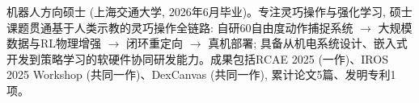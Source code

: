 
\begin{cvparagraph}
机器人方向硕士 (上海交通大学, 2026年6月毕业)。专注灵巧操作与强化学习, 硕士课题贯通基于人类示教的灵巧操作全链路: 自研60自由度动作捕捉系统 $\rightarrow$ 大规模数据与RL物理增强 $\rightarrow$ 闭环重定向 $\rightarrow$ 真机部署; 具备从机电系统设计、嵌入式开发到策略学习的软硬件协同研发能力。成果包括RCAE 2025 (一作)、IROS 2025 Workshop (共同一作)、DexCanvas (共同一作), 累计论文5篇、发明专利1项。
\vspace{-2mm}
\end{cvparagraph}
